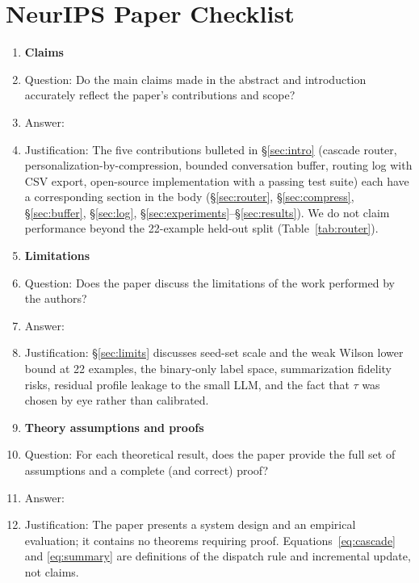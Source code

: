 \section*{NeurIPS Paper Checklist}

\begin{enumerate}

\item {\bf Claims}
    \item[] Question: Do the main claims made in the abstract and introduction accurately reflect the paper's contributions and scope?
    \item[] Answer: \answerYes{}
    \item[] Justification: The five contributions bulleted in \S\ref{sec:intro} (cascade router, personalization-by-compression, bounded conversation buffer, routing log with CSV export, open-source implementation with a passing test suite) each have a corresponding section in the body (\S\ref{sec:router}, \S\ref{sec:compress}, \S\ref{sec:buffer}, \S\ref{sec:log}, \S\ref{sec:experiments}--\S\ref{sec:results}). We do not claim performance beyond the 22-example held-out split (Table~\ref{tab:router}).

\item {\bf Limitations}
    \item[] Question: Does the paper discuss the limitations of the work performed by the authors?
    \item[] Answer: \answerYes{}
    \item[] Justification: \S\ref{sec:limits} discusses seed-set scale and the weak Wilson lower bound at 22 examples, the binary-only label space, summarization fidelity risks, residual profile leakage to the small LLM, and the fact that $\tau$ was chosen by eye rather than calibrated.

\item {\bf Theory assumptions and proofs}
    \item[] Question: For each theoretical result, does the paper provide the full set of assumptions and a complete (and correct) proof?
    \item[] Answer: \answerNA{}
    \item[] Justification: The paper presents a system design and an empirical evaluation; it contains no theorems requiring proof. Equations~\ref{eq:cascade} and \ref{eq:summary} are definitions of the dispatch rule and incremental update, not claims.


\end{enumerate}
